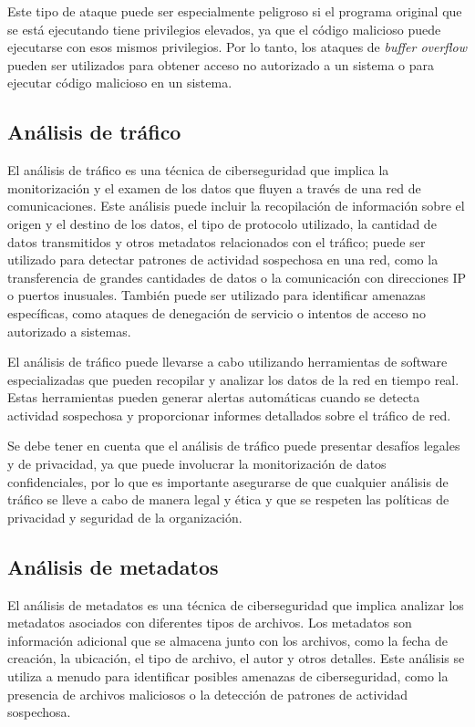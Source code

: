             Este tipo de ataque puede ser especialmente peligroso si el programa original que se está ejecutando tiene privilegios elevados, ya que el código malicioso puede ejecutarse con esos mismos privilegios. Por lo tanto, los ataques de \textit{buffer overflow} pueden ser utilizados para obtener acceso no autorizado a un sistema o para ejecutar código malicioso en un sistema.
        
        
        \subsection{Análisis de tráfico}
            
            El análisis de tráfico es una técnica de ciberseguridad que implica la monitorización y el examen de los datos que fluyen a través de una red de comunicaciones. Este análisis puede incluir la recopilación de información sobre el origen y el destino de los datos, el tipo de protocolo utilizado, la cantidad de datos transmitidos y otros metadatos relacionados con el tráfico; puede ser utilizado para detectar patrones de actividad sospechosa en una red, como la transferencia de grandes cantidades de datos o la comunicación con direcciones IP o puertos inusuales. También puede ser utilizado para identificar amenazas específicas, como ataques de denegación de servicio o intentos de acceso no autorizado a sistemas.
            
            El análisis de tráfico puede llevarse a cabo utilizando herramientas de software especializadas que pueden recopilar y analizar los datos de la red en tiempo real. Estas herramientas pueden generar alertas automáticas cuando se detecta actividad sospechosa y proporcionar informes detallados sobre el tráfico de red.
            
            Se debe tener en cuenta que el análisis de tráfico puede presentar desafíos legales y de privacidad, ya que puede involucrar la monitorización de datos confidenciales, por lo que es importante asegurarse de que cualquier análisis de tráfico se lleve a cabo de manera legal y ética y que se respeten las políticas de privacidad y seguridad de la organización.
        
        \subsection{Análisis de metadatos}
            
            El análisis de metadatos es una técnica de ciberseguridad que implica analizar los metadatos asociados con diferentes tipos de archivos. Los metadatos son información adicional que se almacena junto con los archivos, como la fecha de creación, la ubicación, el tipo de archivo, el autor y otros detalles. Este análisis se utiliza a menudo para identificar posibles amenazas de ciberseguridad, como la presencia de archivos maliciosos o la detección de patrones de actividad sospechosa.
            

